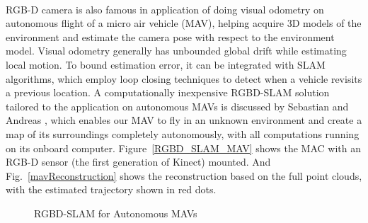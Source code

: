 \\\indent%
RGB-D camera is also famous in application of doing visual odometry on autonomous flight of a micro air vehicle (MAV), helping acquire 3D models of the environment and estimate the camera pose with respect to the environment model. Visual odometry generally has unbounded global drift while estimating local motion. To bound estimation error, it can be integrated with SLAM algorithms, which employ loop closing techniques to detect when a vehicle revisits a previous location. A computationally inexpensive RGBD-SLAM solution tailored to the application on autonomous MAVs is discussed by Sebastian and Andreas \cite{RGBDSLAMmav_2013}, which enables our MAV to fly in an unknown environment and create a map of its surroundings completely autonomously, with all computations running on its onboard computer. Figure~\ref{RGBD_SLAM_MAV} shows the MAC with an RGB-D sensor (the first generation of Kinect) mounted. And Fig.~\ref{mavReconstruction} shows the reconstruction based on the full point clouds, with the estimated trajectory shown in red dots. 
%
\\\indent
%
\begin{figure}[t]
\centering
{}
\caption{RGBD-SLAM for Autonomous MAVs \cite{RGBDSLAMmav_2013}}
\label{autoRGBD_SLAM_MAV}
\end{figure}%
